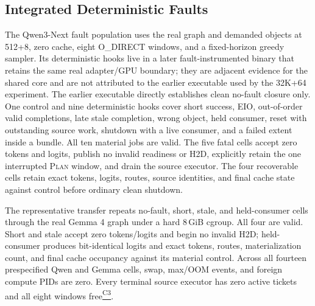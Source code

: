 \documentclass[letterpaper,twocolumn,10pt]{article}
\newcommand{\Plan}{\textsc{Plan}\xspace}
\newcommand{\GiB}{\,GiB\xspace}
\newcommand{\claimref}[1]{\hyperlink{claim:#1}{\textsuperscript{\textsf{#1}}}}
\begin{document}
\subsection{Integrated Deterministic Faults}
\label{sec:faults}

The Qwen3-Next fault population uses the real graph and demanded objects at
512+8, zero cache, eight O\_DIRECT windows, and a fixed-horizon greedy sampler.
Its deterministic hooks live in a later fault-instrumented binary that retains
the same real adapter/GPU boundary; they are adjacent evidence for the shared
core and are not attributed to the earlier executable used by the 32K+64
experiment.  The earlier executable directly establishes clean no-fault
closure only.
One control and nine deterministic hooks cover short success, EIO,
out-of-order valid completions, late stale completion, wrong object, held
consumer, reset with outstanding source work, shutdown with a live consumer,
and a failed extent inside a bundle.  All ten material jobs are valid.  The
five fatal cells accept zero tokens and logits, publish no invalid readiness or
H2D, explicitly retain the one interrupted \Plan window, and drain the source
executor.  The four recoverable cells retain exact tokens, logits, routes,
source identities, and final cache state against control before ordinary clean
shutdown.

The representative transfer repeats no-fault, short, stale, and held-consumer
cells through the real Gemma 4 graph under a hard 8\GiB cgroup.  All four are
valid.  Short and stale accept zero tokens/logits and begin no invalid H2D;
held-consumer produces bit-identical logits and exact tokens, routes,
materialization count, and final cache occupancy against its material control.
Across all fourteen prespecified Qwen and Gemma cells, swap, max/OOM events,
and foreign compute PIDs are zero.  Every terminal source executor has zero
active tickets and all eight windows free\claimref{C3}.
\end{document}
